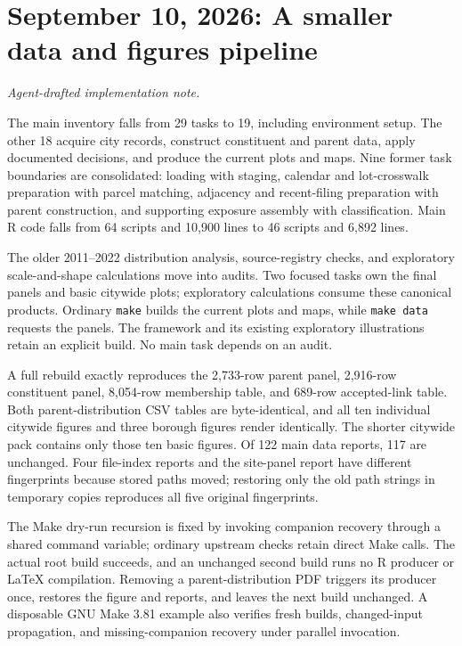 \clearpage
\section*{September 10, 2026: A smaller data and figures pipeline}
\textit{Agent-drafted implementation note.}

The main inventory falls from 29 tasks to 19, including environment setup. The other 18 acquire city records, construct constituent and parent data, apply documented decisions, and produce the current plots and maps. Nine former task boundaries are consolidated: loading with staging, calendar and lot-crosswalk preparation with parcel matching, adjacency and recent-filing preparation with parent construction, and supporting exposure assembly with classification. Main R code falls from 64 scripts and 10,900 lines to 46 scripts and 6,892 lines.

The older 2011--2022 distribution analysis, source-registry checks, and exploratory scale-and-shape calculations move into audits. Two focused tasks own the final panels and basic citywide plots; exploratory calculations consume these canonical products. Ordinary \texttt{make} builds the current plots and maps, while \texttt{make data} requests the panels. The framework and its existing exploratory illustrations retain an explicit build. No main task depends on an audit.

A full rebuild exactly reproduces the 2,733-row parent panel, 2,916-row constituent panel, 8,054-row membership table, and 689-row accepted-link table. Both parent-distribution CSV tables are byte-identical, and all ten individual citywide figures and three borough figures render identically. The shorter citywide pack contains only those ten basic figures. Of 122 main data reports, 117 are unchanged. Four file-index reports and the site-panel report have different fingerprints because stored paths moved; restoring only the old path strings in temporary copies reproduces all five original fingerprints.

The Make dry-run recursion is fixed by invoking companion recovery through a shared command variable; ordinary upstream checks retain direct Make calls. The actual root build succeeds, and an unchanged second build runs no R producer or LaTeX compilation. Removing a parent-distribution PDF triggers its producer once, restores the figure and reports, and leaves the next build unchanged. A disposable GNU Make 3.81 example also verifies fresh builds, changed-input propagation, and missing-companion recovery under parallel invocation.

